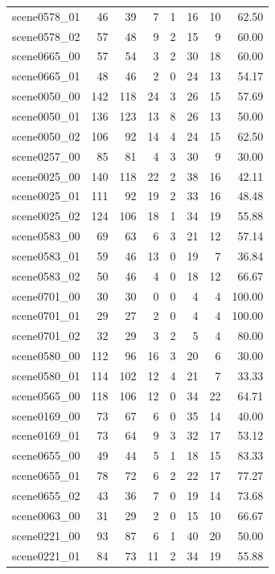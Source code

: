 \begin{table}[t]
\begin{tabular}{lrrrrrrr}
scene0578\_01 & 46 & 39 & 7 & 1 & 16 & 10 & 62.50 \\
scene0578\_02 & 57 & 48 & 9 & 2 & 15 & 9 & 60.00 \\
scene0665\_00 & 57 & 54 & 3 & 2 & 30 & 18 & 60.00 \\
scene0665\_01 & 48 & 46 & 2 & 0 & 24 & 13 & 54.17 \\
scene0050\_00 & 142 & 118 & 24 & 3 & 26 & 15 & 57.69 \\
scene0050\_01 & 136 & 123 & 13 & 8 & 26 & 13 & 50.00 \\
scene0050\_02 & 106 & 92 & 14 & 4 & 24 & 15 & 62.50 \\
scene0257\_00 & 85 & 81 & 4 & 3 & 30 & 9 & 30.00 \\
scene0025\_00 & 140 & 118 & 22 & 2 & 38 & 16 & 42.11 \\
scene0025\_01 & 111 & 92 & 19 & 2 & 33 & 16 & 48.48 \\
scene0025\_02 & 124 & 106 & 18 & 1 & 34 & 19 & 55.88 \\
scene0583\_00 & 69 & 63 & 6 & 3 & 21 & 12 & 57.14 \\
scene0583\_01 & 59 & 46 & 13 & 0 & 19 & 7 & 36.84 \\
scene0583\_02 & 50 & 46 & 4 & 0 & 18 & 12 & 66.67 \\
scene0701\_00 & 30 & 30 & 0 & 0 & 4 & 4 & 100.00 \\
scene0701\_01 & 29 & 27 & 2 & 0 & 4 & 4 & 100.00 \\
scene0701\_02 & 32 & 29 & 3 & 2 & 5 & 4 & 80.00 \\
scene0580\_00 & 112 & 96 & 16 & 3 & 20 & 6 & 30.00 \\
scene0580\_01 & 114 & 102 & 12 & 4 & 21 & 7 & 33.33 \\
scene0565\_00 & 118 & 106 & 12 & 0 & 34 & 22 & 64.71 \\
scene0169\_00 & 73 & 67 & 6 & 0 & 35 & 14 & 40.00 \\
scene0169\_01 & 73 & 64 & 9 & 3 & 32 & 17 & 53.12 \\
scene0655\_00 & 49 & 44 & 5 & 1 & 18 & 15 & 83.33 \\
scene0655\_01 & 78 & 72 & 6 & 2 & 22 & 17 & 77.27 \\
scene0655\_02 & 43 & 36 & 7 & 0 & 19 & 14 & 73.68 \\
scene0063\_00 & 31 & 29 & 2 & 0 & 15 & 10 & 66.67 \\
scene0221\_00 & 93 & 87 & 6 & 1 & 40 & 20 & 50.00 \\
scene0221\_01 & 84 & 73 & 11 & 2 & 34 & 19 & 55.88 \\

\end{tabular}
\end{table}
